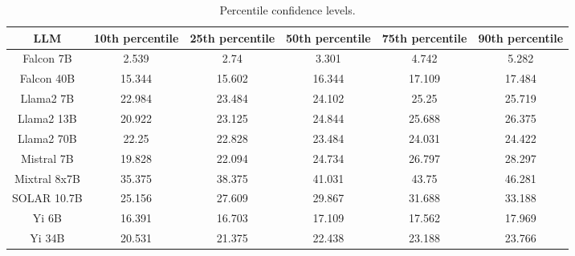 \begin{table*}
\centering
\begin{tabular}{c|c|c|c|c|c}
LLM & 10th percentile & 25th percentile & 50th percentile & 75th percentile & 90th percentile\\ \hline
Falcon 7B & 2.539 & 2.74 & 3.301 & 4.742 & 5.282\\
Falcon 40B & 15.344 & 15.602 & 16.344 & 17.109 & 17.484\\
Llama2 7B & 22.984 & 23.484 & 24.102 & 25.25 & 25.719\\
Llama2 13B & 20.922 & 23.125 & 24.844 & 25.688 & 26.375\\
Llama2 70B & 22.25 & 22.828 & 23.484 & 24.031 & 24.422\\
Mistral 7B & 19.828 & 22.094 & 24.734 & 26.797 & 28.297\\
Mixtral 8x7B & 35.375 & 38.375 & 41.031 & 43.75 & 46.281\\
SOLAR 10.7B & 25.156 & 27.609 & 29.867 & 31.688 & 33.188\\
Yi 6B & 16.391 & 16.703 & 17.109 & 17.562 & 17.969\\
Yi 34B & 20.531 & 21.375 & 22.438 & 23.188 & 23.766\\
\hline
\end{tabular}
\caption{Percentile confidence levels.}
\label{tab:percentile_conf}
\end{table*}
